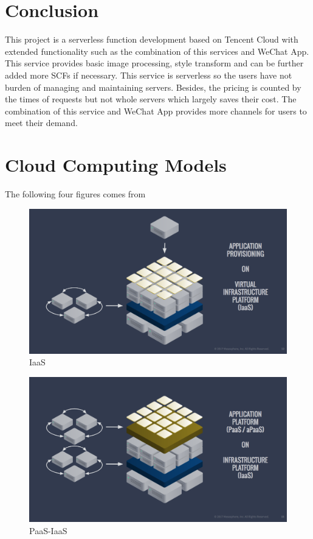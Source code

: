 \documentclass[a4paper,12pt]{article}
\begin{document}
\section{Conclusion}
This project is a serverless function development based on Tencent Cloud with extended functionality such as the combination of this services and WeChat App. This service provides basic image processing, style transform and can be further added more SCFs if necessary. This service is serverless so the users have not burden of managing and maintaining servers. Besides, the pricing is counted by the times of requests but not whole servers which largely saves their cost. The combination of this service and WeChat App provides more channels for users to meet their demand.

\appendix

\section{Cloud Computing Models}
\label{sec:appendix3}
The following four figures comes from \cite{models}
\begin{figure}[H]
\includegraphics[scale=0.32]{figures/IaaS.png}
\caption{IaaS}
\end{figure}
\begin{figure}[H]
\includegraphics[scale=0.32]{figures/PaaS-IaaS.png}
\caption{PaaS-IaaS}
\end{figure}
\end{document}
